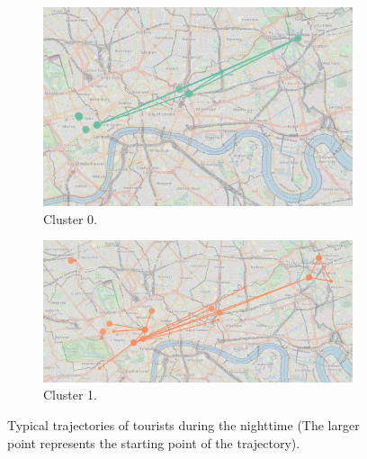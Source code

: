 \documentclass{article}
\theoremstyle{definition}
\theoremstyle{remark}
\begin{document}
\begin{figure}[!h]

\centering
\begin{subfigure}{0.6\textheight}
\centering
\includegraphics[width=0.4\linewidth]{figures/nighttime_tourists_c0.png}
\caption{Cluster 0.}
\label{fig:nighttime_tourists_c0}
\end{subfigure}
\begin{subfigure}{0.6\textheight}
\centering
\includegraphics[width=0.4\linewidth]{figures/nighttime_tourists_c1.png}
\caption{Cluster 1.}
\label{fig:nighttime_tourists_c1}
\end{subfigure}

\caption{Typical trajectories of tourists during the nighttime (The larger point represents the starting point of the trajectory).}
\label{fig:sequences_nighttime_tourists}
\end{figure}
\end{document}

